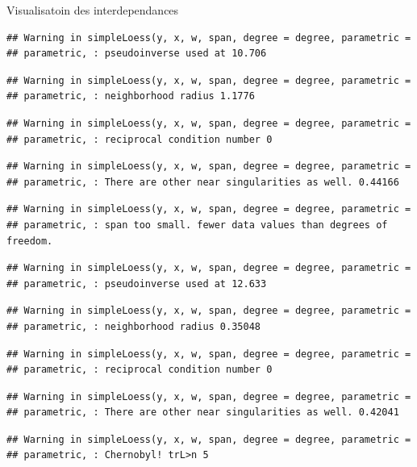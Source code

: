 \documentclass[11pt,ignorenonframetext,]{beamer}
\begin{document}
\begin{frame}[fragile]{Visualisatoin des interdependances}
\begin{verbatim}
## Warning in simpleLoess(y, x, w, span, degree = degree, parametric =
## parametric, : pseudoinverse used at 10.706
\end{verbatim}

\begin{verbatim}
## Warning in simpleLoess(y, x, w, span, degree = degree, parametric =
## parametric, : neighborhood radius 1.1776
\end{verbatim}

\begin{verbatim}
## Warning in simpleLoess(y, x, w, span, degree = degree, parametric =
## parametric, : reciprocal condition number 0
\end{verbatim}

\begin{verbatim}
## Warning in simpleLoess(y, x, w, span, degree = degree, parametric =
## parametric, : There are other near singularities as well. 0.44166
\end{verbatim}

\begin{verbatim}
## Warning in simpleLoess(y, x, w, span, degree = degree, parametric =
## parametric, : span too small. fewer data values than degrees of freedom.
\end{verbatim}

\begin{verbatim}
## Warning in simpleLoess(y, x, w, span, degree = degree, parametric =
## parametric, : pseudoinverse used at 12.633
\end{verbatim}

\begin{verbatim}
## Warning in simpleLoess(y, x, w, span, degree = degree, parametric =
## parametric, : neighborhood radius 0.35048
\end{verbatim}

\begin{verbatim}
## Warning in simpleLoess(y, x, w, span, degree = degree, parametric =
## parametric, : reciprocal condition number 0
\end{verbatim}

\begin{verbatim}
## Warning in simpleLoess(y, x, w, span, degree = degree, parametric =
## parametric, : There are other near singularities as well. 0.42041
\end{verbatim}

\begin{verbatim}
## Warning in simpleLoess(y, x, w, span, degree = degree, parametric =
## parametric, : Chernobyl! trL>n 5


\end{verbatim}
\end{frame}
\end{document}
